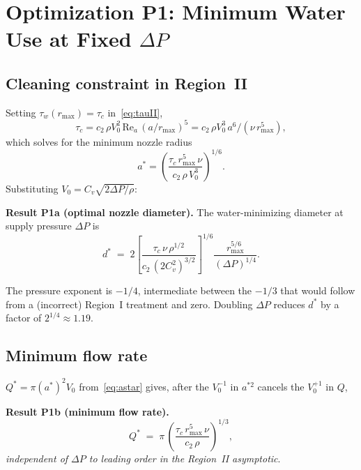 \documentclass[aps,prfluids,reprint,amsmath,amssymb,floatfix]{revtex4-2}
\newcommand{\Rey}{\mathrm{Re}}
\begin{document}
\section{Optimization P1: Minimum Water Use at Fixed $\Delta P$}
\label{sec:P1}

\subsection{Cleaning constraint in Region~II}

Setting $\tau_w(r_\mathrm{max}) = \tau_c$ in~\eqref{eq:tauII},
\begin{equation}
  \tau_c = c_2\,\rho V_0^2\,\Rey_a\,(a/r_\mathrm{max})^5
  = c_2\,\rho V_0^3\,a^6 / (\nu\,r_\mathrm{max}^5),
  \label{eq:cleanII}
\end{equation}
which solves for the minimum nozzle radius
\begin{equation}
  a^* = \left(\frac{\tau_c\,r_\mathrm{max}^5\,\nu}{c_2\,\rho\,V_0^3}\right)^{1/6}.
  \label{eq:astar}
\end{equation}
Substituting $V_0 = C_v\sqrt{2\Delta P/\rho}$:
\begin{mdframed}[style=resultbox]
\textbf{Result P1a (optimal nozzle diameter).}
The water-minimizing diameter at supply pressure $\Delta P$ is
\begin{equation}
  d^* \;=\; 2\left[\frac{\tau_c\,\nu\,\rho^{1/2}}{c_2\,(2 C_v^2)^{3/2}}\right]^{1/6}
  \frac{r_\mathrm{max}^{5/6}}{(\Delta P)^{1/4}}.
  \label{eq:dstar}
\end{equation}
\end{mdframed}
The pressure exponent is $-1/4$, intermediate between the $-1/3$ that
would follow from a (incorrect) Region~I treatment and zero. Doubling
$\Delta P$ reduces $d^*$ by a factor of $2^{1/4} \approx 1.19$.

\subsection{Minimum flow rate}

$Q^* = \pi (a^*)^2 V_0$ from~\eqref{eq:astar} gives, after the $V_0^{-1}$
in $a^{*2}$ cancels the $V_0^{+1}$ in $Q$,
\begin{mdframed}[style=resultbox]
\textbf{Result P1b (minimum flow rate).}
\begin{equation}
  Q^* \;=\; \pi\,\left(\frac{\tau_c\,r_\mathrm{max}^5\,\nu}{c_2\,\rho}\right)^{1/3},
  \label{eq:Qstar}
\end{equation}
\emph{independent of $\Delta P$ to leading order in the Region~II asymptotic}.
\end{mdframed}
\end{document}
